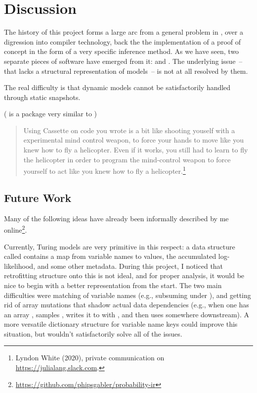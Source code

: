 \chapter{Discussion}
\label{cha:discussion}

The history of this project forms a large arc from a general problem in \turingjl{}, over a
digression into compiler technology, back the the implementation of a proof of concept in the form
of a very specific inference method.  As we have seen, two separate pieces of software have emerged
from it: \irtrackerjl{} and \autogibbsjl{}.  The underlying issue~-- that \turingjl{} lacks a
structural representation of models~-- is not at all resolved by them.

The real difficulty is that dynamic models cannot be satisfactorily handled through static
snapshots. 

( is a package very similar to )
\begin{quote}
  Using Cassette on code you wrote is a bit like shooting youself with a experimental mind control
  weapon, to force your hands to move like you knew how to fly a helicopter. Even if it works, you
  still had to learn to fly the helicopter in order to program the mind-control weapon to force
  yourself to act like you knew how to fly a helicopter.\footnote{Lyndon White (2020), private
    communication on \protect\url{https://julialang.slack.com}.}
\end{quote}




\section{Future Work}
\label{sec:future-work}

Many of the following ideas have already been informally described by me
online\footnote{\protect\url{https://github.com/phipsgabler/probability-ir}}.

Currently, Turing models are very primitive in this respect: a data structure called 
contains a map from variable names to values, the accumulated log-likelihood, and some other
metadata. During this project, I noticed that retrofitting structure onto this is not ideal, and for
proper analysis, it would be nice to begin with a better representation from the start. The two main
difficulties were matching of variable names (e.g., subsuming  under
), and getting rid of array mutations that shadow actual data dependencies (e.g.,
when one has an array , samples , writes it to  with
, and then uses  somewhere downstream).  A more versatile
dictionary structure for variable name keys could improve this situation, but wouldn't
satisfactorily solve all of the issues.

